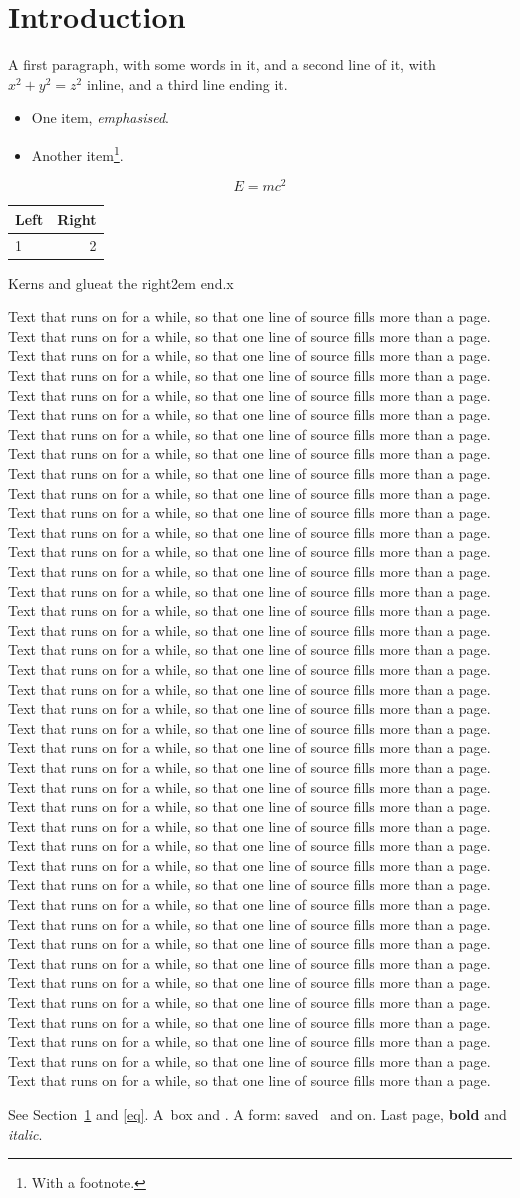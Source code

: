 \documentclass{article}
\def\filler{Text that runs on for a while, so that one line of source fills more than a page. }
\def\fillers{\filler\filler\filler\filler\filler\filler\filler\filler\filler\filler}
\begin{document}
\section{Introduction}\label{intro}
A first paragraph, with some words in it,
and a second line of it, with $x^2 + y^2 = z^2$ inline,
and a third line ending it.



\begin{itemize}
  \item One item, \emph{emphasised}.
  \item Another item\footnote{With a footnote.}.
\end{itemize}

\begin{equation}
  E = mc^2 \label{eq}
\end{equation}

\begin{center}
\begin{tabular}{l|r}
  Left & Right \\
  \hline
  1 & 2 \\
\end{tabular}
\end{center}

Kerns and glue\hfill at the right\kern 2em end.\hspace{3em}x

\fillers\fillers\fillers\fillers

See Section~\ref{intro} and \eqref{eq}. \mbox{A box} and .
A form: \hbox{saved} \pdfrefxform\pdflastxform\ and on.
\newpage
Last page, \textbf{bold} and \textit{italic}.
\end{document}
